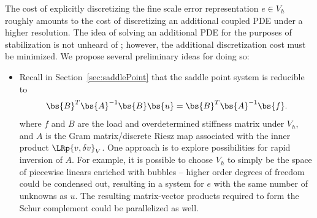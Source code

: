 The cost of explicitly discretizing the fine scale error representation $e\in V_h$ roughly amounts to the cost of discretizing an additional coupled PDE under a higher resolution.   The idea of solving an additional PDE for the purposes of stabilization is not unheard of \cite{Barter}; however, the additional discretization cost must be minimized.  We propose several preliminary ideas for doing so: 
\begin{itemize}
\item Recall in Section~\ref{sec:saddlePoint} that the saddle point system is reducible to 
\[
\bs{B}^T \bs{A}^{-1}\bs{B} \bs{u} = \bs{B}^T \bs{A}^{-1}\bs{f}.
\]
where $f$ and $B$ are the load and overdetermined stiffness matrix under $V_h$, and $A$ is the Gram matrix/discrete Riesz map associated with the inner product $\LRp{v,\delta v}_V$.  One approach is to explore possibilities for rapid inversion of $A$.  For example, it is possible to choose $V_h$ to simply be the space of piecewise linears enriched with bubbles -- higher order degrees of freedom could be condensed out, resulting in a system for $e$ with the same number of unknowns as $u$.  The resulting matrix-vector products required to form the Schur complement could be parallelized as well.  


\end{itemize}
